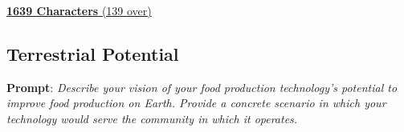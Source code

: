 \documentclass{report}
\begin{document}
\uline{\textbf{1639 Characters} (139 over)}


\subsection{Terrestrial Potential}
\label{sec:terrestrial}

\textbf{Prompt}: \textit{Describe your vision of your food production technology’s potential to improve food production on Earth. Provide a concrete scenario in which your technology would serve the community in which it operates.}




\end{document}
